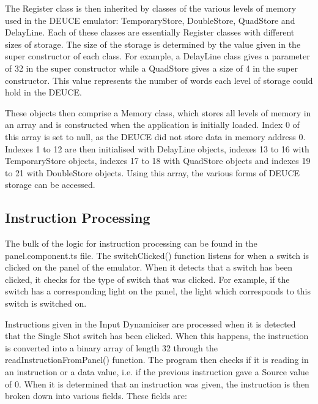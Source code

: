 \documentclass{l4proj}
\begin{document}
The Register class is then inherited by classes of the various levels of memory used in the DEUCE emulator: TemporaryStore, DoubleStore, QuadStore and DelayLine. Each of these classes are essentially Register classes with different sizes of storage. The size of the storage is determined by the value given in the super constructor of each class. For example, a DelayLine class gives a parameter of 32 in the super constructor while a QuadStore gives a size of 4 in the super constructor. This value represents the number of words each level of storage could hold in the DEUCE.

These objects then comprise a Memory class, which stores all levels of memory in an array and is constructed when the application is initially loaded. Index 0 of this array is set to null, as the DEUCE did not store data in memory address 0. Indexes 1 to 12 are then initialised with DelayLine objects, indexes 13 to 16 with TemporaryStore objects, indexes 17 to 18 with QuadStore objects and indexes 19 to 21 with DoubleStore objects. Using this array, the various forms of DEUCE storage can be accessed.

\subsection{Instruction Processing}
The bulk of the logic for instruction processing can be found in the panel.component.ts file. The switchClicked() function listens for when a switch is clicked on the panel of the emulator. When it detects that a switch has been clicked, it checks for the type of switch that was clicked. For example, if the switch has a corresponding light on the panel, the light which corresponds to this switch is switched on. 

Instructions given in the Input Dynamiciser are processed when it is detected that the Single Shot switch has been clicked. When this happens, the instruction is converted into a binary array of length 32 through the readInstructionFromPanel() function. The program then checks if it is reading in an instruction or a data value, i.e. if the previous instruction gave a Source value of 0. When it is determined that an instruction was given, the instruction is then broken down into various fields. These fields are:
\end{document}
